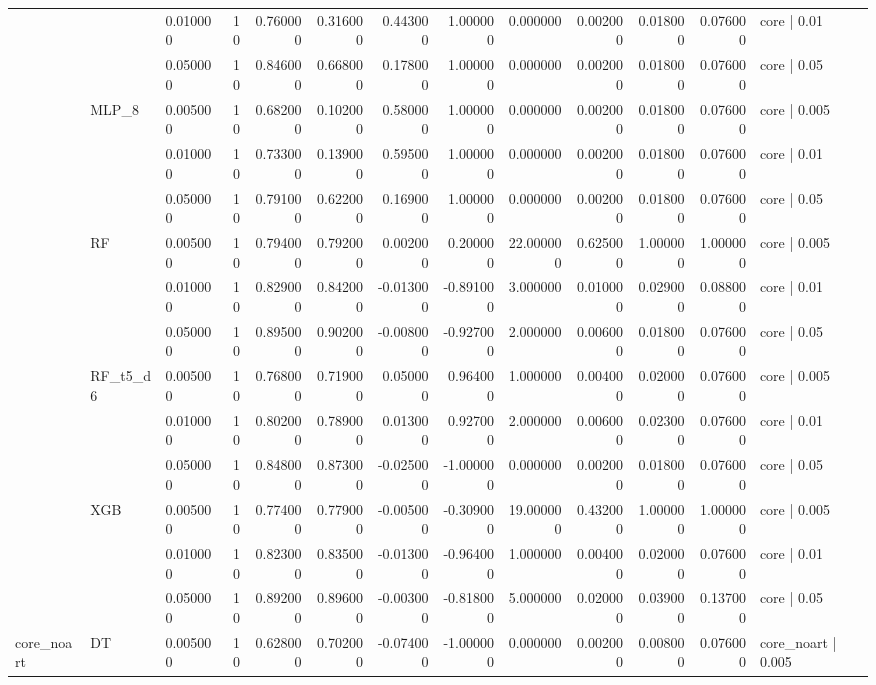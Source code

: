 \begin{tabular}{lllrrrrrrrrrl}
 &  & 0.010000 & 10 & 0.760000 & 0.316000 & 0.443000 & 1.000000 & 0.000000 & 0.002000 & 0.018000 & 0.076000 & core | 0.01 \\
 &  & 0.050000 & 10 & 0.846000 & 0.668000 & 0.178000 & 1.000000 & 0.000000 & 0.002000 & 0.018000 & 0.076000 & core | 0.05 \\
\cline{2-13}
 & \multirow[t]{3}{*}{MLP_8} & 0.005000 & 10 & 0.682000 & 0.102000 & 0.580000 & 1.000000 & 0.000000 & 0.002000 & 0.018000 & 0.076000 & core | 0.005 \\
 &  & 0.010000 & 10 & 0.733000 & 0.139000 & 0.595000 & 1.000000 & 0.000000 & 0.002000 & 0.018000 & 0.076000 & core | 0.01 \\
 &  & 0.050000 & 10 & 0.791000 & 0.622000 & 0.169000 & 1.000000 & 0.000000 & 0.002000 & 0.018000 & 0.076000 & core | 0.05 \\
\cline{2-13}
 & \multirow[t]{3}{*}{RF} & 0.005000 & 10 & 0.794000 & 0.792000 & 0.002000 & 0.200000 & 22.000000 & 0.625000 & 1.000000 & 1.000000 & core | 0.005 \\
 &  & 0.010000 & 10 & 0.829000 & 0.842000 & -0.013000 & -0.891000 & 3.000000 & 0.010000 & 0.029000 & 0.088000 & core | 0.01 \\
 &  & 0.050000 & 10 & 0.895000 & 0.902000 & -0.008000 & -0.927000 & 2.000000 & 0.006000 & 0.018000 & 0.076000 & core | 0.05 \\
\cline{2-13}
 & \multirow[t]{3}{*}{RF_t5_d6} & 0.005000 & 10 & 0.768000 & 0.719000 & 0.050000 & 0.964000 & 1.000000 & 0.004000 & 0.020000 & 0.076000 & core | 0.005 \\
 &  & 0.010000 & 10 & 0.802000 & 0.789000 & 0.013000 & 0.927000 & 2.000000 & 0.006000 & 0.023000 & 0.076000 & core | 0.01 \\
 &  & 0.050000 & 10 & 0.848000 & 0.873000 & -0.025000 & -1.000000 & 0.000000 & 0.002000 & 0.018000 & 0.076000 & core | 0.05 \\
\cline{2-13}
 & \multirow[t]{3}{*}{XGB} & 0.005000 & 10 & 0.774000 & 0.779000 & -0.005000 & -0.309000 & 19.000000 & 0.432000 & 1.000000 & 1.000000 & core | 0.005 \\
 &  & 0.010000 & 10 & 0.823000 & 0.835000 & -0.013000 & -0.964000 & 1.000000 & 0.004000 & 0.020000 & 0.076000 & core | 0.01 \\
 &  & 0.050000 & 10 & 0.892000 & 0.896000 & -0.003000 & -0.818000 & 5.000000 & 0.020000 & 0.039000 & 0.137000 & core | 0.05 \\
\cline{1-13} \cline{2-13}
\multirow[t]{12}{*}{core_noart} & \multirow[t]{3}{*}{DT} & 0.005000 & 10 & 0.628000 & 0.702000 & -0.074000 & -1.000000 & 0.000000 & 0.002000 & 0.008000 & 0.076000 & core_noart | 0.005 \\

\end{tabular}
